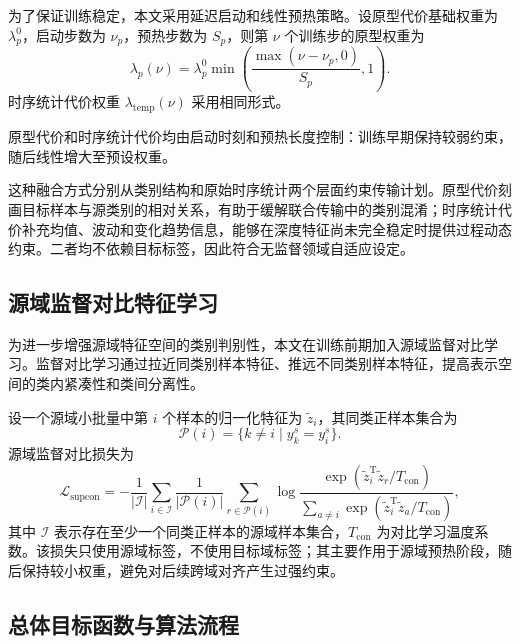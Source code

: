 \documentclass{seuthesis-2022}
\begin{document}
为了保证训练稳定，本文采用延迟启动和线性预热策略。设原型代价基础权重为 $\lambda_p^0$，启动步数为 $\nu_p$，预热步数为 $S_p$，则第 $\nu$ 个训练步的原型权重为
\begin{equation}
    \lambda_p(\nu)
    =
    \lambda_p^0
    \min
    \left(
    \frac{\max(\nu-\nu_p,0)}{S_p},
    1
    \right).
\end{equation}
时序统计代价权重 $\lambda_{\mathrm{temp}}(\nu)$ 采用相同形式。

原型代价和时序统计代价均由启动时刻和预热长度控制：训练早期保持较弱约束，随后线性增大至预设权重。

这种融合方式分别从类别结构和原始时序统计两个层面约束传输计划。原型代价刻画目标样本与源类别的相对关系，有助于缓解联合传输中的类别混淆；时序统计代价补充均值、波动和变化趋势信息，能够在深度特征尚未完全稳定时提供过程动态约束。二者均不依赖目标标签，因此符合无监督领域自适应设定。

\subsection{源域监督对比特征学习}

为进一步增强源域特征空间的类别判别性，本文在训练前期加入源域监督对比学习。监督对比学习通过拉近同类别样本特征、推远不同类别样本特征，提高表示空间的类内紧凑性和类间分离性\cite{khosla2020supcon}。

设一个源域小批量中第 $i$ 个样本的归一化特征为 $\tilde{z}_i$，其同类正样本集合为
\begin{equation}
    \mathcal{P}(i)=\{k\neq i\mid y_k^s=y_i^s\}.
\end{equation}
源域监督对比损失为
\begin{equation}
    \mathcal{L}_{\mathrm{supcon}}
    =
    -\frac{1}{|\mathcal{I}|}
    \sum_{i\in\mathcal{I}}
    \frac{1}{|\mathcal{P}(i)|}
    \sum_{r\in\mathcal{P}(i)}
    \log
    \frac{
    \exp(\tilde{z}_i^{\mathrm T}\tilde{z}_r/T_{\mathrm{con}})
    }{
    \sum_{a\neq i}
    \exp(\tilde{z}_i^{\mathrm T}\tilde{z}_a/T_{\mathrm{con}})
    },
\end{equation}
其中 $\mathcal{I}$ 表示存在至少一个同类正样本的源域样本集合，$T_{\mathrm{con}}$ 为对比学习温度系数。该损失只使用源域标签，不使用目标域标签；其主要作用于源域预热阶段，随后保持较小权重，避免对后续跨域对齐产生过强约束。

\subsection{总体目标函数与算法流程}
\end{document}

